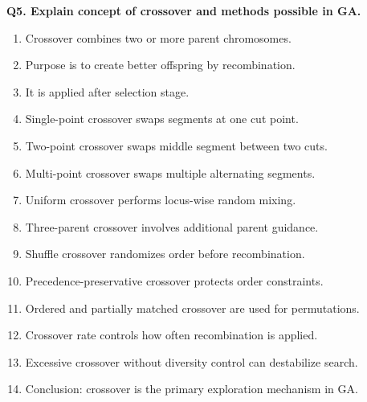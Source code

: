 \documentclass[11pt,a4paper]{article}
\begin{document}
\textbf{Q5. Explain concept of crossover and methods possible in GA.}
\begin{enumerate}
\item Crossover combines two or more parent chromosomes.
\item Purpose is to create better offspring by recombination.
\item It is applied after selection stage.
\item Single-point crossover swaps segments at one cut point.
\item Two-point crossover swaps middle segment between two cuts.
\item Multi-point crossover swaps multiple alternating segments.
\item Uniform crossover performs locus-wise random mixing.
\item Three-parent crossover involves additional parent guidance.
\item Shuffle crossover randomizes order before recombination.
\item Precedence-preservative crossover protects order constraints.
\item Ordered and partially matched crossover are used for permutations.
\item Crossover rate controls how often recombination is applied.
\item Excessive crossover without diversity control can destabilize search.
\item Conclusion: crossover is the primary exploration mechanism in GA.
\end{enumerate}
\end{document}
